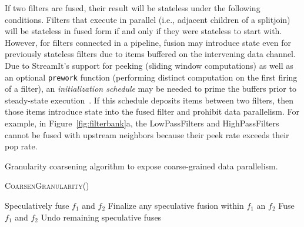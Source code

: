 If two filters are fused, their result will be stateless under the
following conditions.  Filters that execute in parallel (i.e.,
adjacent children of a splitjoin) will be stateless in fused form if
and only if they were stateless to start with.  However, for filters
connected in a pipeline, fusion may introduce state even for
previously stateless filters due to items buffered on the intervening
data channel.  Due to StreamIt's support for peeking (sliding window
computations) as well as an optional {\tt prework} function
(performing distinct computation on the first firing of a filter), an
{\it initialization schedule} may be needed to prime the buffers prior
to steady-state execution~\cite{karczma-thesis}.  If this schedule
deposits items between two filters, then those items introduce state
into the fused filter and prohibit data parallelism.  For example, in
Figure~\ref{fig:filterbank}a, the LowPassFilters and
HighPassFilters cannot be fused with upstream neighbors because their
peek rate exceeds their pop rate.


\begin{algorithm}[t]
\caption{Granularity coarsening algorithm to expose coarse-grained
data parallelism. \label{fig:coarsening-code}}
\textsc{CoarsenGranularity}()
\begin{algorithmic}
\Repeat
			\State Speculatively fuse $f_1$ and $f_2$
			\State Finalize any speculative fusion within
$f_1$ an $f_2$
			\State Fuse $f_1$ and $f_2$
		\EndIf
	\EndFor
{}
\State Undo remaining speculative fuses	
\end{algorithmic}
\end{algorithm}


